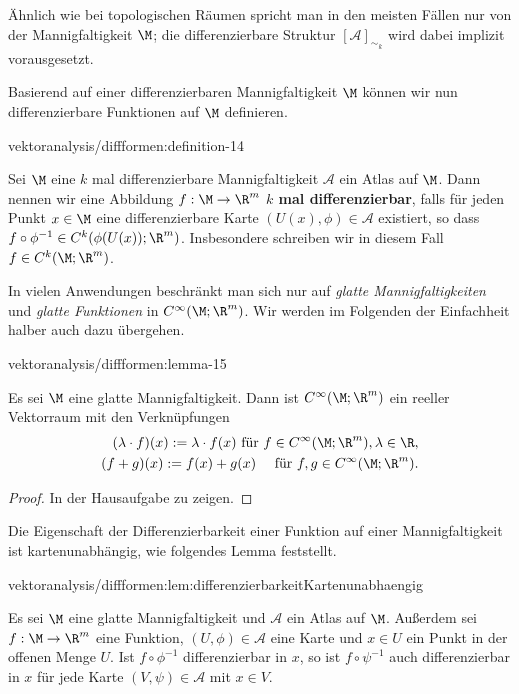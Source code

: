 \documentclass[letterpaper,10pt,english]{jupyterBook}
\begin{document}
\par
Ähnlich wie bei topologischen Räumen spricht man in den meisten Fällen nur von der Mannigfaltigkeit \(\M\); die differenzierbare Struktur \([\mathcal{A}]_{\sim_k}\) wird dabei implizit vorausgesetzt.

\par
Basierend auf einer differenzierbaren Mannigfaltigkeit \(\M\) können wir nun differenzierbare Funktionen auf \(\M\) definieren.
\begin{definition}{}{vektoranalysis/diffformen:definition-14}



\par
Sei \(\M\) eine \(k\) mal differenzierbare Mannigfaltigkeit \(\mathcal{A}\) ein Atlas auf \(\M\).
Dann nennen wir eine Abbildung \(f:\M\to\R^m\) \textbf{\(k\) mal differenzierbar}, falls für jeden Punkt \(x\in\M\) eine differenzierbare Karte \((U(x),\phi)\in\mathcal{A}\) existiert, so dass \(f\circ\phi^{-1} \in C^k(\phi(U(x)); \R^m)\).
Insbesondere schreiben wir in diesem Fall \(f\in C^k(\M; \R^m)\).
\end{definition}

\par
In vielen Anwendungen beschränkt man sich nur auf \emph{glatte Mannigfaltigkeiten} und \emph{glatte Funktionen} in \(C^\infty(\M; \R^m)\).
Wir werden im Folgenden der Einfachheit halber auch dazu übergehen.
\begin{lemma}{}{vektoranalysis/diffformen:lemma-15}



\par
Es sei \(\M\) eine glatte Mannigfaltigkeit.
Dann ist \(C^\infty(\M; \R^m)\) ein reeller Vektorraum mit den Verknüpfungen
\begin{align*}
(\lambda \cdot f)(x) := \lambda\cdot f(x)\text{ für } f\in C^\infty(\M; \R^m), \lambda\in\R,\\
(f + g)(x) := f(x) + g(x)\quad\text{ für } f,g\in C^\infty(\M; \R^m).
\end{align*}\end{lemma}

\begin{proof}
 In der Hausaufgabe zu zeigen.
\end{proof}

\par
Die Eigenschaft der Differenzierbarkeit einer Funktion auf einer Mannigfaltigkeit ist kartenunabhängig, wie folgendes Lemma feststellt.
\begin{lemma}{}{vektoranalysis/diffformen:lem:differenzierbarkeitKartenunabhaengig}



\par
Es sei \(\M\) eine glatte Mannigfaltigkeit und \(\mathcal{A}\) ein Atlas auf \(\M\).
Außerdem sei \(f:\M \to \R^m\) eine Funktion, \((U,\phi)\in \mathcal{A}\) eine Karte und \(x \in U\) ein Punkt in der offenen Menge \(U\).
Ist \(f\circ\phi^{-1}\) differenzierbar in \(x\), so ist \(f\circ\psi^{-1}\) auch differenzierbar in \(x\) für jede Karte \((V,\psi) \in \mathcal{A}\) mit \(x\in V\).
\end{lemma}
\end{document}
